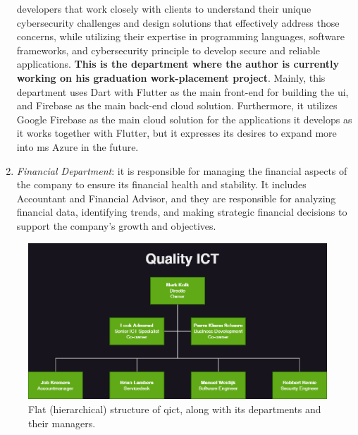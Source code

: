 \begin{enumerate}
            developers that work closely with clients to understand their unique cybersecurity challenges and
            design solutions that effectively address those concerns, while utilizing their expertise in
            programming languages, software frameworks, and cybersecurity principle to develop secure and
            reliable applications. \textbf{This is the department where the author is currently working on his graduation work-placement
                  project}. Mainly, this department uses Dart with Flutter as the main front-end for building the \acrshort{ui}, and Firebase
            as the main back-end cloud solution. Furthermore, it utilizes Google Firebase as the  main cloud solution for the applications it
            develops as it works together with Flutter, but it expresses its desires to expand more into \acrshort{ms} Azure in the future.
      \item \textit{Financial Department}: it is responsible for managing the financial aspects of the company
            to ensure its financial health and stability. It includes Accountant and Financial Advisor, and
            they are responsible for analyzing financial data, identifying trends, and making strategic
            financial decisions to support the company's growth and objectives.
\end{enumerate}

\begin{figure}[H]
      \centering
      \includegraphics[width=1.0\textwidth]{Figures/OrganizationalDiagram_QICT.png}
      \caption{Flat (hierarchical) structure of \acrshort{qict}, along with its departments and their managers.}
\end{figure}

